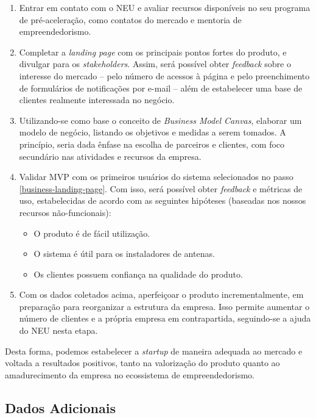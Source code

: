 \documentclass[]{politex}
\begin{document}
\begin{enumerate}
\item Entrar em contato com o NEU e avaliar recursos disponíveis no seu
programa de pré-aceleração, como contatos do mercado e mentoria de
empreendedorismo.
\item\label{business-landing-page} Completar a \textit{landing page} com os
principais pontos fortes do produto, e divulgar para os \textit{stakeholders}.
Assim, será possível obter \textit{feedback} sobre o interesse do mercado --
pelo número de acessos à página e pelo preenchimento de formulários de
notificações por e-mail -- além de estabelecer uma base de clientes realmente
interessada no negócio.
\item Utilizando-se como base o conceito de \textit{Business Model Canvas},
elaborar um modelo de negócio, listando os objetivos e medidas a serem tomados.
A princípio, seria dada ênfase na escolha de parceiros e clientes, com foco
secundário nas atividades e recursos da empresa.
\item Validar MVP com os primeiros usuários do sistema selecionados no passo
\ref{business-landing-page}. Com isso, será possível obter \textit{feedback} e
métricas de uso, estabelecidas de acordo com as seguintes hipóteses (baseadas
nos nossos recursos não-funcionais):
\begin{itemize}
\item O produto é de fácil utilização.
\item O sistema é útil para os instaladores de antenas.
\item Os clientes possuem confiança na qualidade do produto.
\end{itemize}
\item Com os dados coletados acima, aperfeiçoar o produto incrementalmente, em
preparação para reorganizar a estrutura da empresa. Isso permite aumentar o
número de clientes e a própria empresa em contrapartida, seguindo-se a ajuda
do NEU nesta etapa.
\end{enumerate}

Desta forma, podemos estabelecer a \textit{startup} de maneira adequada ao
mercado e voltada a resultados positivos, tanto na valorização do produto quanto
ao amadurecimento da empresa no ecossistema de empreendedorismo.

\subsection{Dados Adicionais}
\end{document}
